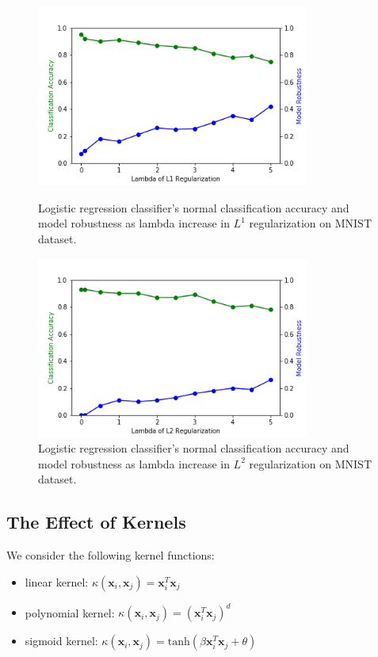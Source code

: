 \documentclass{article}
\begin{document}
\begin{figure}[h!]
  \centering
  \begin{minipage}{0.48\textwidth}
  \centering
  \includegraphics[width=0.8\textwidth]{sparsity_l1.png}
  \caption{Logistic regression classifier's normal classification accuracy and model robustness as lambda increase in $L^{1}$ regularization on MNIST dataset. }
  \label{fig:l1-mnist}
  \end{minipage}
  \hfill
  \begin{minipage}{0.48\textwidth}
  \centering
    \includegraphics[width=0.8\textwidth]{sparsity.png}
  \caption{Logistic regression classifier's normal classification accuracy and model robustness as lambda increase in $L^{2}$ regularization on MNIST dataset. }
  \label{fig:l2}
  \end{minipage}
  \hfill
\end{figure}


\subsection{The Effect of Kernels}
We consider the following kernel functions:
\begin{itemize}
    \item linear kernel: $\kappa (\bm{x}_{i}, \bm{x}_{j})=\bm{x}_{i}^{T}\bm{x}_{j}$
    \item polynomial kernel: $\kappa (\bm{x}_{i}, \bm{x}_{j})=(\bm{x}_{i}^{T}\bm{x}_{j})^{d}$
    \item sigmoid kernel: $\kappa (\bm{x}_{i}, \bm{x}_{j})=\text{tanh}(\beta \bm{x}_{i}^{T}\bm{x}_{j} + \theta)$
\end{itemize}
\end{document}
